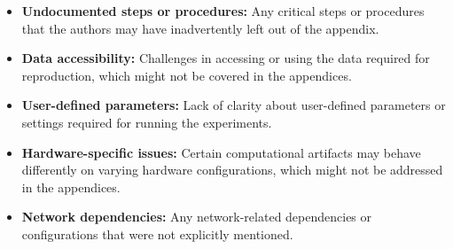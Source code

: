 \documentclass[conference]{IEEEtran}
\begin{document}
\begin{aerhint}
\begin{itemize}
\begin{itemize}
        \item \textbf{Undocumented steps or procedures:} Any critical steps or procedures that the authors may have inadvertently left out of the appendix.
        \item \textbf{Data accessibility:} Challenges in accessing or using the data required for reproduction, which might not be covered in the appendices.
        \item \textbf{User-defined parameters:} Lack of clarity about user-defined parameters or settings required for running the experiments.
        \item \textbf{Hardware-specific issues:} Certain computational artifacts may behave differently on varying hardware configurations, which might not be addressed in the appendices.
        \item \textbf{Network dependencies:} Any network-related dependencies or configurations that were not explicitly mentioned.
    \end{itemize}
\end{itemize}
\end{aerhint}

\aerdisclaimer
\end{document}

